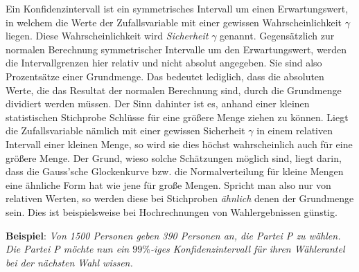 Ein Konfidenzintervall ist ein symmetrisches Intervall um einen Erwartungswert, in welchem die Werte der Zufallsvariable mit einer gewissen Wahrscheinlichkeit $\gamma$ liegen. Diese Wahrscheinlichkeit wird \emph{Sicherheit} $\gamma$ genannt. Gegens\"{a}tzlich zur normalen Berechnung symmetrischer Intervalle um den Erwartungswert, werden die Intervallgrenzen hier relativ und nicht absolut angegeben. Sie sind also Prozents\"{a}tze einer Grundmenge. Das bedeutet lediglich, dass die absoluten Werte, die das Resultat der normalen Berechnung sind, durch die Grundmenge dividiert werden m\"{u}ssen. Der Sinn dahinter ist es, anhand einer kleinen statistischen Stichprobe Schl\"{u}sse f\"{u}r eine gr\"{o}\ss{}ere Menge ziehen zu k\"{o}nnen. Liegt die Zufallsvariable n\"{a}mlich mit einer gewissen Sicherheit $\gamma$ in einem relativen Intervall einer kleinen Menge, so wird sie dies h\"{o}chst wahrscheinlich auch f\"{u}r eine gr\"{o}\ss{}ere Menge. Der Grund, wieso solche Sch\"{a}tzungen m\"{o}glich sind, liegt darin, dass die Gauss'sche Glockenkurve bzw. die Normalverteilung f\"{u}r kleine Mengen eine \"{a}hnliche Form hat wie jene f\"{u}r gro\ss{}e Mengen. Spricht man also nur von relativen Werten, so werden diese bei Stichproben \emph{\"{a}hnlich} denen der Grundmenge sein. Dies ist beispielsweise bei Hochrechnungen von Wahlergebnissen g\"{u}nstig.

\textbf{Beispiel}: \emph{Von 1500 Personen geben 390 Personen an, die Partei P zu w\"{a}hlen. Die Partei P m\"{o}chte nun ein $99\%$-iges Konfidenzintervall f\"{u}r ihren W\"{a}hlerantel bei der n\"{a}chsten Wahl wissen.}


